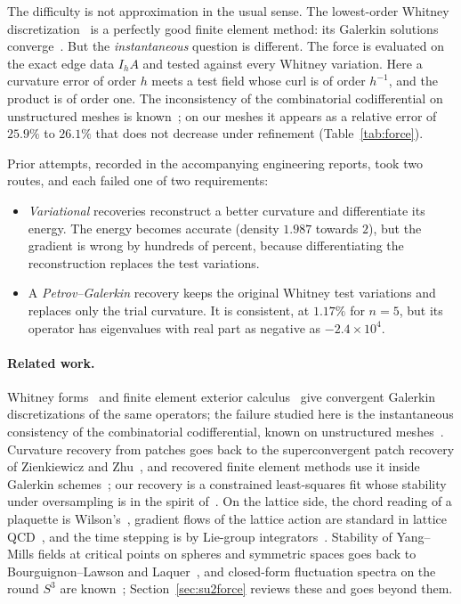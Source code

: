 \documentclass[11pt]{article}
\theoremstyle{definition}
\theoremstyle{remark}
\begin{document}
The difficulty is not approximation in the usual sense. The lowest-order Whitney
discretization~\cite{whitney1957,bossavit1988} is a perfectly good finite element method:
its Galerkin solutions converge~\cite{afw2006,afw2010,hiptmair2002}. But the
\emph{instantaneous} question is different. The force is evaluated on the exact edge data
$I_hA$ and tested against every Whitney variation. Here a curvature error of order $h$
meets a test field whose curl is of order $h^{-1}$, and the product is of order one. The
inconsistency of the combinatorial codifferential on unstructured meshes is
known~\cite{afgt2014}; on our meshes it appears as a relative error of $25.9\%$ to
$26.1\%$ that does not decrease under refinement (Table~\ref{tab:force}).

Prior attempts, recorded in the accompanying engineering reports, took two routes, and
each failed one of two requirements:
\begin{itemize}
  \item \emph{Variational} recoveries reconstruct a better curvature and differentiate
    its energy. The energy becomes accurate (density $1.987$ towards $2$), but the
    gradient is wrong by hundreds of percent, because differentiating the reconstruction
    replaces the test variations.
  \item A \emph{Petrov--Galerkin} recovery keeps the original Whitney test variations and
    replaces only the trial curvature. It is consistent, at $1.17\%$ for $n=5$, but its
    operator has eigenvalues with real part as negative as $-2.4\times 10^{4}$.
\end{itemize}

\paragraph{Related work.} Whitney forms~\cite{whitney1957,bossavit1988} and finite element exterior
calculus~\cite{afw2006,afw2010,hiptmair2002} give convergent Galerkin discretizations of the same
operators; the failure studied here is the instantaneous consistency of the combinatorial
codifferential, known on unstructured meshes~\cite{afgt2014}. Curvature recovery from patches goes
back to the superconvergent patch recovery of Zienkiewicz and Zhu~\cite{zz1992}, and recovered finite
element methods use it inside Galerkin schemes~\cite{gp2018}; our recovery is a constrained least-squares
fit whose stability under oversampling is in the spirit of~\cite{cdl2013}. On the lattice side, the
chord reading of a plaquette is Wilson's~\cite{wilson1974}, gradient flows of the lattice action are
standard in lattice QCD~\cite{luscher2010}, and the time stepping is by Lie-group
integrators~\cite{munthekaas1998,iserles2000}. Stability of Yang--Mills fields at critical points
on spheres and symmetric spaces goes back to Bourguignon--Lawson and Laquer~\cite{bl1981,laquer1984},
and closed-form fluctuation spectra on the round $S^3$ are known~\cite{klc2021};
Section~\ref{sec:su2force} reviews these and goes beyond them.
\end{document}
